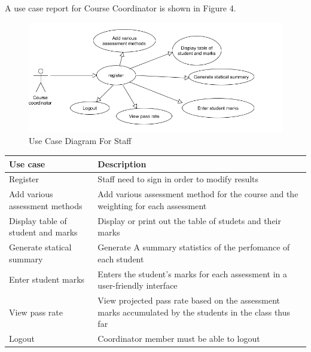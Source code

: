 \documentclass[10pt,onecolumn]{RequimentsGathering}
\begin{document}
	A use case report for Course Coordinator is shown in Figure 4.
	\begin{center}
		\begin{figure}[h]
			\centering
			\includegraphics[trim={0cm 0cm 0cm 0cm },clip,scale = 0.85]{CourseCoordinatorUsecase}
			\caption{Use Case Diagram For Staff}
		\end{figure}
	\end{center}
	
	
	
	\begin{center}
		\begin{tabular}{ | p{3cm} | p{10cm}| }
			\hline
			\textbf{Use case}& \textbf{Description} \\ \hline
			Register & Staff need to sign in order to modify results \\ \hline
			Add various assessment methods & Add various assessment method for the course and the weighting for each assessment  \\ \hline
			
			Display table of student and marks & Display or print out the table
of studets and their marks\\ \hline
            Generate statical summary & Generate A summary statistics of the perfomance of each student  \\ \hline
            Enter student marks & Enters the student's marks for each assessment in a user-friendly interface \\ \hline
            View pass rate & View projected pass rate based on the assessment marks accumulated by the students in the class thus far \\ \hline
			Logout          & Coordinator member must be able to logout  \\ \hline
			
		\end{tabular}
	\end{center}
	
\end{document}
